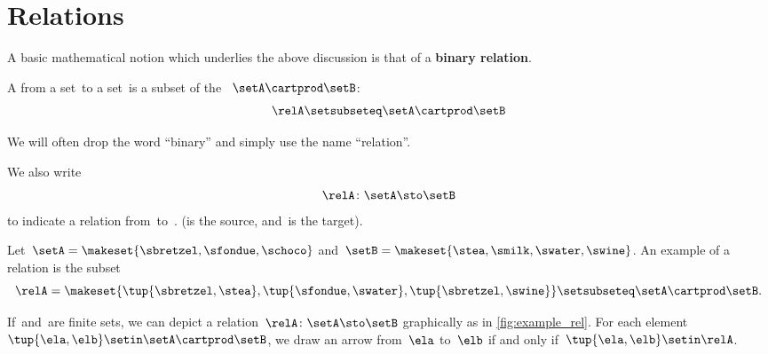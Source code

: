 
\section{Relations}
\label{sec:connection-relations}

A basic mathematical notion which underlies the above discussion is that of a \textbf{binary relation}.

\begin{ctdefinition}
    \label{def:binary-relation}
    A  \relA from a set~\setA to a set~\setB is a subset of the ~$\setA\cartprod \setB$:
    \begin{equation}
        \relA \setsubseteq \setA \cartprod \setB
    \end{equation}
\end{ctdefinition}

We will often drop the word ``binary'' and simply use the name ``relation''.

We also write
\begin{equation}
    \relA \colon \setA \sto \setB
\end{equation}
to indicate a relation from~\setA to~\setB.
(\setA is the source, and~\setB is the target).

\begin{marginfigure}
    \centering
    \caption{}
    \label{fig:example_rel}
\end{marginfigure}

\begin{example}
    \label{exa:simple-rel}
    Let~$\setA = \makeset{ \sbretzel, \sfondue, \schoco}$ and~$\setB = \makeset{ \stea, \smilk, \swater, \swine }$.
    An example of a relation is the subset
    \begin{equation}
        \relA = \makeset{ \tup{\sbretzel, \stea}, \tup{\sfondue, \swater}, \tup{\sbretzel, \swine} } \setsubseteq \setA \cartprod \setB.
    \end{equation}
\end{example}

If~\setA and~\setB are finite sets, we can depict a relation~$\relA \colon \setA \sto \setB$ graphically as in \cref{fig:example_rel}.
For each element~$\tup{\ela,\elb} \setin \setA \cartprod \setB$, we draw an arrow from~$\ela$ to~$\elb$ if and only if~$\tup{\ela,\elb} \setin \relA$.

